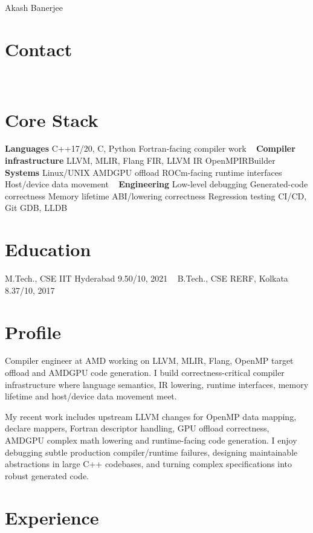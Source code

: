 \documentclass[a4paper]{cv-style}
\begin{document}
\header
  {Akash }{Banerjee}

\begin{aside}
\section{Contact}
~
\section{Core Stack}
\textbf{Languages}
C++17/20, C, Python
Fortran-facing compiler work
~
\textbf{Compiler infrastructure}
LLVM, MLIR, Flang
FIR, LLVM IR
OpenMPIRBuilder
~
\textbf{Systems}
Linux/UNIX
AMDGPU offload
ROCm-facing runtime interfaces
Host/device data movement
~
\textbf{Engineering}
Low-level debugging
Generated-code correctness
Memory lifetime
ABI/lowering correctness
Regression testing
CI/CD, Git
GDB, LLDB
\section{Education}
M.Tech., CSE
IIT Hyderabad
9.50/10, 2021
~
B.Tech., CSE
RERF, Kolkata
8.37/10, 2017
\end{aside}

\section{Profile}
\begingroup\raggedright
Compiler engineer at AMD working on LLVM, MLIR, Flang, OpenMP target offload and AMDGPU code generation. I build correctness-critical compiler infrastructure where language semantics, IR lowering, runtime interfaces, memory lifetime and host/device data movement meet.

My recent work includes upstream LLVM changes for OpenMP data mapping, declare mappers, Fortran descriptor handling, GPU offload correctness, AMDGPU complex math lowering and runtime-facing code generation. I enjoy debugging subtle production compiler/runtime failures, designing maintainable abstractions in large C++ codebases, and turning complex specifications into robust generated code.
\par\endgroup

\section{Experience}
\end{document}
